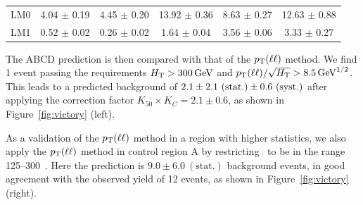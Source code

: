 \begin{table}[hbt]
\begin{center}
\begin{tabular}{l||c|c|c|c||c}
\hline
\hline
                 LM0                    &   4.04  $\pm$  0.19  &   4.45  $\pm$  0.20   &  13.92  $\pm$  0.36   &   8.63  $\pm$  0.27   &  12.63  $\pm$  0.88  \\
                 LM1                    &   0.52  $\pm$  0.02  &   0.26  $\pm$  0.02   &   1.64  $\pm$  0.04   &   3.56  $\pm$  0.06   &   3.33  $\pm$  0.27  \\
\hline
\end{tabular}
\end{center}
\end{table}




The ABCD prediction is then compared with that of the $p_{\mathrm{T}}(\ell \ell)$ method.
We find 1 event passing the requirements $H_{\mathrm{T}} > 300\,\text{Ge\hspace{-.08em}V}$ and 
$p_{\mathrm{T}}(\ell\ell)/\sqrt{H_{\mathrm{T}}} > 8.5\,\text{Ge\hspace{-.08em}V}^{1/2}$. This leads to a predicted
background of $2.1 \pm 2.1~({\rm stat.}) \pm 0.6~({\rm syst.})$ after applying
the correction factor $K_{50} \times K_C = 2.1 \pm 0.6$,
as shown in Figure~\ref{fig:victory} (left).

As a validation of the $p_{\mathrm{T}}(\ell\ell)$ method in a region with higher statistics,
we also apply the $p_{\mathrm{T}}(\ell\ell)$ method in control region A by restricting
\HT\ to be in the range 125--300~\GeV. Here the prediction is $9.0 \pm 6.0~(\textrm{stat.})$
background events, in good agreement with the observed yield of 12 events, as shown
in Figure~\ref{fig:victory} (right).

